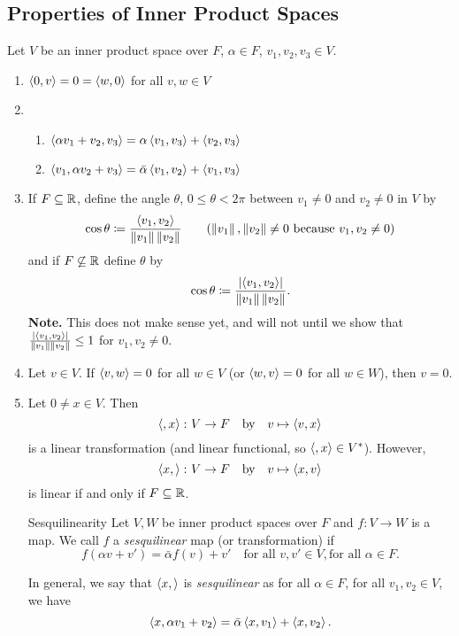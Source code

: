 \documentclass[class=article, crop=false]{standalone}
\begin{document}
  \subsection{Properties of Inner Product Spaces}
  Let $V$ be an inner product space over $F$, $\alpha\in F$, $v_1,v_2,v_3\in V$.
  \begin{enumerate}[label=(\alph*)]
    \item $\left\langle 0,v \right\rangle=0=\left\langle w,0 \right\rangle$ for all $v,w\in V$
    \item 
    \begin{enumerate}[label=\roman*.]
      \item $\left\langle \alpha v_1+v_2,v_3 \right\rangle = \alpha \left\langle v_1,v_3 \right\rangle+\left\langle v_2,v_3 \right\rangle$
      \item $\left\langle v_1, \alpha v_2 + v_3 \right\rangle = \bar{\alpha}\left\langle v_1,v_2 \right\rangle+ \left\langle v_1,v_3 \right\rangle$
    \end{enumerate}
    \item If $F\subseteq\mathbb{R}$, define the angle $\theta$, $0\leq \theta < 2\pi$ between $v_1\neq 0$ and $v_2\neq 0$ in $V$ by
    \[
      \cos\theta\ceq \frac{\tup{v_1,v_2}}{\norm{v_1}\norm{v_2}} \tag{$\norm{v_1},\norm{v_2}\neq 0$ because $v_1,v_2\neq 0$}
    \]
    and if $F\not\subseteq\mathbb{R}$ define $\theta$ by
    \[
      \cos\theta\coloneqq \frac{\left\lvert \left\langle v_1,v_2 \right\rangle \right\rvert}{\left\lVert v_1\right\rVert\left\lVert v_2\right\rVert}.
    \]
    \textbf{Note.} This does not make sense yet, and will not until we show that $\frac{\left\lvert \left\langle v_1,v_2 \right\rangle \right\rvert}{\left\lVert v_1\right\rVert\left\lVert v_2\right\rVert}\leq 1$ for $v_1,v_2\neq 0$.
    \item Let $v\in V$. If $\left\langle v,w \right\rangle=0$ for all $w\in V$ (or $\left\langle w,v \right\rangle = 0$ for all $w\in W$), then $v=0$.
    \item Let $0\neq x\in V$. Then
    \[
      \left\langle ,x \right\rangle\colon V\to F \quad \text{by}\quad v\mapsto \left\langle v, x \right\rangle
    \]
    is a linear transformation (and linear functional, so $\left\langle ,x \right\rangle\in V^*$). However, 
    \[
      \left\langle x, \right\rangle\colon V\to F \quad \text{by}\quad v\mapsto \left\langle x, v \right\rangle
    \]
    is linear if and only if $F\subseteq\mathbb{R}$. 
    \begin{definition}{Sesquilinearity}
      Let $V, W$ be inner product spaces over $F$ and $f\colon V\to W$ is a map. We call $f$ a \emph{sesquilinear} map (or transformation) if 
      \[
        f(\alpha v + v') = \bar{\alpha}f(v) + v' \quad \text{for all }v,v'\in V, \text{for all }\alpha\in F.
      \] 
    \end{definition}
    In general, we say that $\left\langle x, \right\rangle$ is \emph{sesquilinear} as for all $\alpha\in F$, for all $v_1,v_2\in V$, we have
    \[
      \left\langle x,\alpha v_1+v_2 \right\rangle = \bar{\alpha}\left\langle x, v_1 \right\rangle +\left\langle x, v_2 \right\rangle.
    \]
  \end{enumerate}
\end{document}
